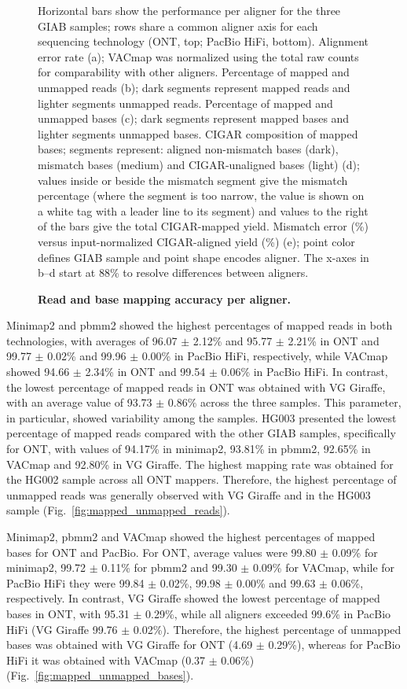 \documentclass[12pt, letterpaper]{article}
\begin{document}
\begin{figure}[!tbp]
    \captionsetup{singlelinecheck=false}
    \caption{
        \textbf{Read and base mapping accuracy per aligner.}}
    \label{fig:alignment_performance}
    \begin{minipage}{\linewidth}\footnotesize\noindent Horizontal bars show the performance per aligner for the three GIAB samples; rows share a common aligner axis for each sequencing technology (ONT, top; PacBio HiFi, bottom). Alignment error rate (a); VACmap was normalized using the total raw counts for comparability with other aligners. Percentage of mapped and unmapped reads (b); dark segments represent mapped reads and lighter segments unmapped reads. Percentage of mapped and unmapped bases (c); dark segments represent mapped bases and lighter segments unmapped bases. CIGAR composition of mapped bases; segments represent: aligned non-mismatch bases (dark), mismatch bases (medium) and CIGAR-unaligned bases (light) (d); values inside or beside the mismatch segment give the mismatch percentage (where the segment is too narrow, the value is shown on a white tag with a leader line to its segment) and values to the right of the bars give the total CIGAR-mapped yield. Mismatch error (\%) versus input-normalized CIGAR-aligned yield (\%) (e); point color defines GIAB sample and point shape encodes aligner. The x-axes in b--d start at 88\% to resolve differences between aligners.
    \end{minipage}
\end{figure}

Minimap2 and pbmm2 showed the highest percentages of mapped reads in both technologies, with averages of 96.07 $\pm$ 2.12\% and 95.77 $\pm$ 2.21\% in ONT and 99.77 $\pm$ 0.02\% and 99.96 $\pm$ 0.00\% in PacBio HiFi, respectively, while VACmap showed 94.66 $\pm$ 2.34\% in ONT and 99.54 $\pm$ 0.06\% in PacBio HiFi. In contrast, the lowest percentage of mapped reads in ONT was obtained with VG Giraffe, with an average value of 93.73 $\pm$ 0.86\% across the three samples. This parameter, in particular, showed variability among the samples. HG003 presented the lowest percentage of mapped reads compared with the other GIAB samples, specifically for ONT, with values of 94.17\% in minimap2, 93.81\% in pbmm2, 92.65\% in VACmap and 92.80\% in VG Giraffe. The highest mapping rate was obtained for the HG002 sample across all ONT mappers. Therefore, the highest percentage of unmapped reads was generally observed with VG Giraffe and in the HG003 sample (Fig.~\ref{fig:mapped_unmapped_reads}).

Minimap2, pbmm2 and VACmap showed the highest percentages of mapped bases for ONT and PacBio. For ONT, average values were 99.80 $\pm$ 0.09\% for minimap2, 99.72 $\pm$ 0.11\% for pbmm2 and 99.30 $\pm$ 0.09\% for VACmap, while for PacBio HiFi they were 99.84 $\pm$ 0.02\%, 99.98 $\pm$ 0.00\% and 99.63 $\pm$ 0.06\%, respectively. In contrast, VG Giraffe showed the lowest percentage of mapped bases in ONT, with 95.31 $\pm$ 0.29\%, while all aligners exceeded 99.6\% in PacBio HiFi (VG Giraffe 99.76 $\pm$ 0.02\%). Therefore, the highest percentage of unmapped bases was obtained with VG Giraffe for ONT (4.69 $\pm$ 0.29\%), whereas for PacBio HiFi it was obtained with VACmap (0.37 $\pm$ 0.06\%) (Fig.~\ref{fig:mapped_unmapped_bases}).
\end{document}

